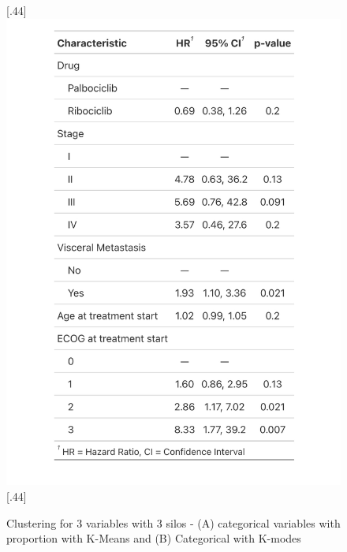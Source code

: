 \begin{figure}[ht]
\caption{Clustering for 3 variables with 3 silos - (A) categorical variables with  proportion with K-Means and (B)  Categorical with K-modes  }\label{fig:tables} 
  [.44\linewidth]{%
    \includegraphics[width=\linewidth]{figures/table_cox_1.jpeg}%
  }%
  \hfill
  [.44\linewidth]{%
}
\end{figure}
